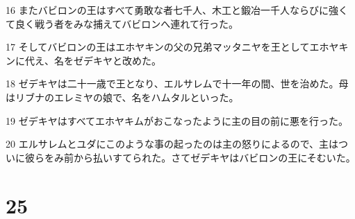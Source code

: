 \par 16 またバビロンの王はすべて勇敢な者七千人、木工と鍛冶一千人ならびに強くて良く戦う者をみな捕えてバビロンへ連れて行った。
\par 17 そしてバビロンの王はエホヤキンの父の兄弟マッタニヤを王としてエホヤキンに代え、名をゼデキヤと改めた。
\par 18 ゼデキヤは二十一歳で王となり、エルサレムで十一年の間、世を治めた。母はリブナのエレミヤの娘で、名をハムタルといった。
\par 19 ゼデキヤはすべてエホヤキムがおこなったように主の目の前に悪を行った。
\par 20 エルサレムとユダにこのような事の起ったのは主の怒りによるので、主はついに彼らをみ前から払いすてられた。さてゼデキヤはバビロンの王にそむいた。

\chapter{25}

